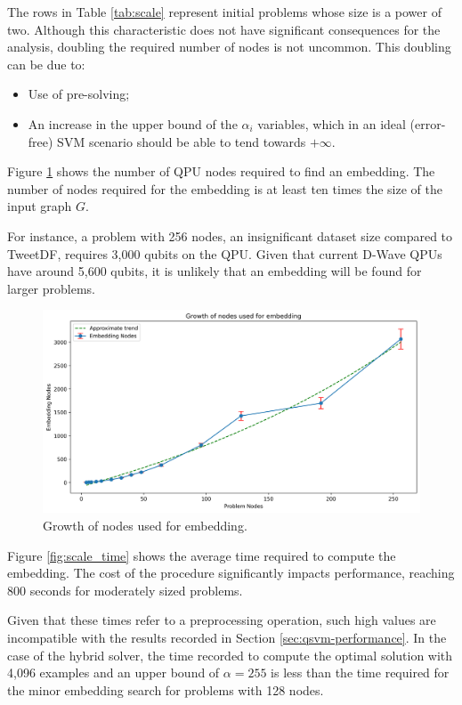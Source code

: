 The rows in Table \ref{tab:scale} represent initial problems whose size is a power of two. 
Although this characteristic does not have significant consequences for the analysis, doubling the required number of nodes is not uncommon. This doubling can be due to:
\begin{itemize} 
	\item Use of pre-solving; 
	\item An increase in the upper bound of the $\alpha_i$ variables, which in an ideal (error-free) SVM scenario should be able to tend towards $+\infty$. 
\end{itemize}

Figure \ref{fig:scale_nodes} shows the number of QPU nodes required to find an embedding. 
The number of nodes required for the embedding is at least ten times the size of the input graph $G$.

For instance, a problem with 256 nodes, an insignificant dataset size compared to TweetDF, requires 3,000 qubits on the QPU. 
Given that current D-Wave QPUs have around 5,600 qubits, it is unlikely that an embedding will be found for larger problems.

\begin{figure}[H] 
	\centering 
	\includegraphics[width=\textwidth]{figures/scale_node.png} 
	\caption{Growth of nodes used for embedding.}
	\label{fig:scale_nodes}
\end{figure}

Figure \ref{fig:scale_time} shows the average time required to compute the embedding. 
The cost of the procedure significantly impacts performance, reaching 800 seconds for moderately sized problems.

Given that these times refer to a preprocessing operation, such high values are incompatible with the results recorded in Section \ref{sec:qsvm-performance}. 
In the case of the hybrid solver, the time recorded to compute the optimal solution with 4,096 examples and an upper bound of $\alpha = 255$ is less than the time required for the minor embedding search for problems with 128 nodes.

